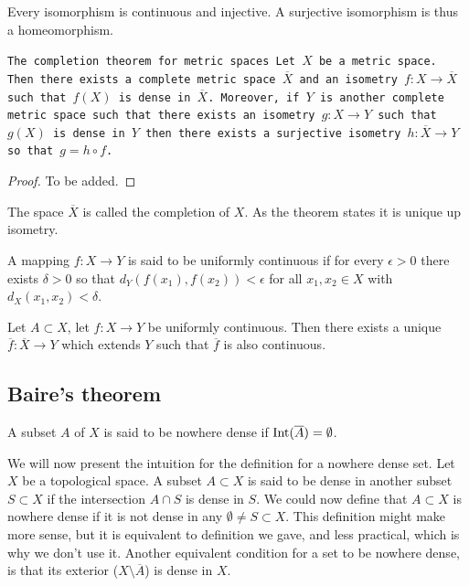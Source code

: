 \documentclass[11pt,a4paper]{article}
\begin{document}
\begin{remark}
  Every isomorphism is continuous and injective. A surjective isomorphism
  is thus a homeomorphism.
\end{remark}

\begin{theorem}
  \tt{The completion theorem for metric spaces}
  Let $X$ be a metric space. Then there exists a complete metric space
  $\overline{X}$ and an isometry $f \colon X \to \overline{X}$ such that 
  $f(X)$ is dense in $\overline{X}$. Moreover, if $Y$ is another complete 
  metric space such that there exists an isometry $g \colon X \to Y$ such that
  $g(X)$ is dense in $Y$ then there exists a surjective isometry
  $h \colon \overline{X} \to Y$ so that $g = h \circ f$.
\end{theorem}
\begin{proof}
  To be added.
\end{proof}

\begin{remark}
  The space $\overline{X}$ is called the completion of $X$. As the theorem
  states it is unique up isometry.
\end{remark}

\begin{definition}
  A mapping $f \colon X \to Y$ is said to be uniformly continuous if for
  every $\epsilon > 0$ there exists $\delta > 0$ so that 
  $d_Y(f(x_1),f(x_2)) < \epsilon$ for all $x_1,x_2 \in X$ with 
  $d_X(x_1,x_2) < \delta$.
\end{definition}

\begin{proposition}
  Let $A \subset X$, let $f \colon X \to Y$ be uniformly continuous.
  Then there exists a unique $\overline{f} \colon \overline{X} \to Y$ 
  which extends $Y$ such that $\overline{f}$ is also continuous.

\end{proposition}

\subsection{Baire's theorem}

\begin{definition}
  A subset $A$ of $X$ is said to be nowhere dense if 
  $\operatorname{Int}(\overline A) = \emptyset$.
\end{definition}

\begin{remark}
  We will now present the intuition for the definition for a nowhere dense set.
  Let $X$ be a topological space.
  A subset $A \subset X$ is said to be dense in another subset $S \subset X$
  if the intersection $A \cap S$ is dense in $S$.
  We could now define that $A \subset X$ is nowhere dense if it is not
  dense in any $\emptyset \neq S \subset X$.
  This definition might make more sense,
  but it is equivalent to definition we gave, and less practical,
  which is why we don't use it.
  Another equivalent condition for a set to be nowhere dense,
  is that its exterior ($X \setminus \overline A$) is dense in $X$.
\end{remark}
\end{document}

